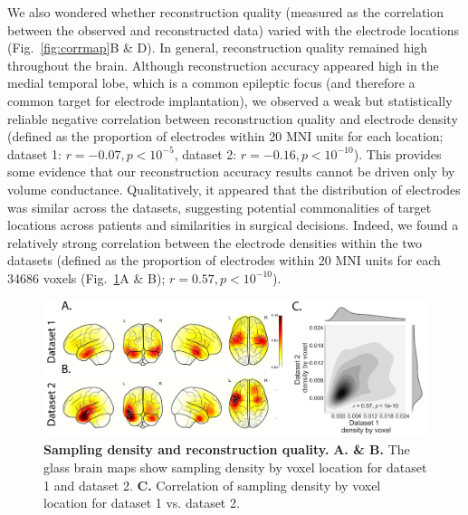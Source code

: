 \documentclass[12pt]{article}
\begin{document}
We also wondered whether reconstruction quality (measured as the
correlation between the observed and reconstructed data) varied with
the electrode locations (Fig.~\ref{fig:corrmap}B \& D). In general, reconstruction quality remained high throughout the brain. Although reconstruction accuracy appeared high in the medial temporal lobe, which is a common epileptic focus (and therefore a common target for electrode implantation), we observed a weak but statistically reliable negative correlation between reconstruction quality and electrode density (defined as the proportion of electrodes within 20 MNI units for each location; dataset 1: $r = -0.07, p < 10^{-5}$, dataset 2: $r = -0.16, p < 10^{-10}$). This provides some evidence that our reconstruction accuracy results cannot be driven only by volume conductance.  Qualitatively, it appeared that the distribution of electrodes was similar across the datasets, suggesting potential commonalities of target locations across patients and similarities in surgical decisions. Indeed, we found a relatively strong correlation between the electrode densities within the two datasets (defined as the proportion of electrodes within 20 MNI units for each 34686 voxels (Fig.~\ref{fig:density}A & B); $r = 0.57, p < 10^{-10}$).  



\begin{figure}
  \centering
  \includegraphics[width=\textwidth]{figs/density}
  \caption{\textbf{Sampling density and reconstruction quality.}
    \textbf{A. \& B. } The glass brain maps show sampling density by voxel location for dataset 1 and dataset 2. \textbf{C.}
      Correlation of sampling density by voxel location for dataset 1 vs. dataset 2.}
  \label{fig:density}
\end{figure}
\end{document}
